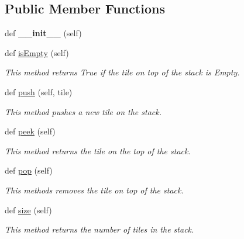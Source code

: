 \subsection*{Public Member Functions}
\begin{DoxyCompactItemize}
\item 
\hypertarget{classsrc_1_1tile_1_1_tile_a9976e652dac509c6aee814af20a6cabb}{}def {\bfseries \+\_\+\+\_\+init\+\_\+\+\_\+} (self)\label{classsrc_1_1tile_1_1_tile_a9976e652dac509c6aee814af20a6cabb}

\item 
def \hyperlink{classsrc_1_1tile_1_1_tile_aad77febc9fbb4fa5fd2f13449d1c80da}{is\+Empty} (self)
\begin{DoxyCompactList}\small\item\em This method returns True if the tile on top of the stack is Empty. \end{DoxyCompactList}\item 
def \hyperlink{classsrc_1_1tile_1_1_tile_ab682d4a8d92f6dbe5380c21e8c27114a}{push} (self, tile)
\begin{DoxyCompactList}\small\item\em This method pushes a new tile on the stack. \end{DoxyCompactList}\item 
def \hyperlink{classsrc_1_1tile_1_1_tile_a0a8402816b245a69773305cc6d86f16d}{peek} (self)
\begin{DoxyCompactList}\small\item\em This method returns the tile on the top of the stack. \end{DoxyCompactList}\item 
def \hyperlink{classsrc_1_1tile_1_1_tile_ae0f31d367515d3259f21b90d6be44db8}{pop} (self)
\begin{DoxyCompactList}\small\item\em This methods removes the tile on top of the stack. \end{DoxyCompactList}\item 
def \hyperlink{classsrc_1_1tile_1_1_tile_ac9f0ddf090f58449aa74611a239e1458}{size} (self)
\begin{DoxyCompactList}\small\item\em This method returns the number of tiles in the stack. \end{DoxyCompactList}\end{DoxyCompactItemize}

